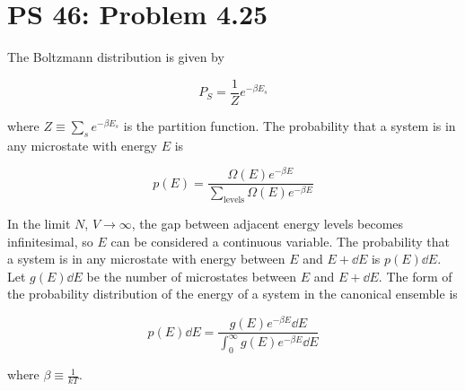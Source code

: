 \documentclass[12pt,a4paper]{article}
\newcommand\ddfrac[2]{\frac{\displaystyle #1}{\displaystyle #2}}
\begin{document}
\setcounter{page}{1}

\section*{PS 46: Problem 4.25}
\bigskip

The Boltzmann distribution is given by

\begin{equation}
	P_S = \frac{1}{Z} e^{-\beta E_s} \label{eq:boltzmann}
\end{equation}

where $Z \equiv \sum_s e^{-\beta E_s}$ is the partition function. The probability that a system is in any microstate with energy $E$ is

\begin{equation}
	p(E) = \ddfrac{\Omega(E) e^{-\beta E}}{\sum_{\mathrm{levels}} \Omega(E) e^{-\beta E}} \label{eq:energy}
\end{equation}

In the limit $N$, $V \rightarrow \infty$, the gap between adjacent energy levels becomes infinitesimal, so $E$ can be considered a continuous variable. The probability that a system is in any microstate with energy between $E$ and $E + \dd{E}$ is $p(E)\dd{E}$. Let $g(E)\dd{E}$ be the number of microstates between $E$ and $E + \dd{E}$. The form of the probability distribution of the energy of a system in the canonical ensemble is

\begin{equation}
	\boxed{
		p(E)\dd{E} = \ddfrac{g(E) e^{-\beta E} \dd{E}}{\int_0^\infty g(E) e^{-\beta E} \dd{E}}
	} \label{eq:answer}
\end{equation}

where $\beta \equiv \ddfrac{1}{kT}$.
\end{document}
